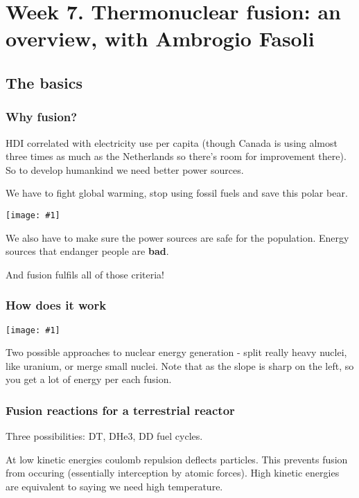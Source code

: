 \documentclass[PlasmaNotes.tex]{subfiles}
\begin{document}
\setcounter{section}{6}
\let\oldexp\exp
\renewcommand{\exp}[1]{\oldexp(#1)}
\newcommand{\png}[1]{\begin{center}\texttt{[image: \#1]}\end{center}}
\newcommand{\goesto}{\rightarrow}
\section{Week 7. Thermonuclear fusion: an overview, with Ambrogio Fasoli}

\subsection{The basics}

\subsubsection{Why fusion?}

HDI correlated with electricity use per capita (though Canada is using almost three times as much as the Netherlands so there's room for improvement there). So to develop humankind we need better power sources.

We have to fight global warming, stop using fossil fuels and save this polar bear.

\png{thisbear.PNG}

We also have to make sure the power sources are safe for the population. Energy sources that endanger people are \textbf{bad}.

And fusion fulfils all of those criteria!

\subsubsection{How does it work}

\png{bindingenergycurve.PNG}

Two possible approaches to nuclear energy generation - split really heavy nuclei, like uranium, or merge small nuclei. Note that as the slope is sharp on the left, so you get a lot of energy per each fusion.

\subsubsection{Fusion reactions for a terrestrial reactor}

Three possibilities: DT, DHe3, DD fuel cycles.

At low kinetic energies coulomb repulsion deflects particles. This prevents fusion from occuring (essentially interception by atomic forces). High kinetic energies are equivalent to saying we need high temperature.
\end{document}
